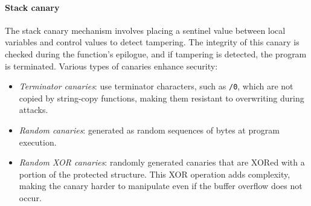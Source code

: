 \paragraph*{Stack canary}
The stack canary mechanism involves placing a sentinel value between local variables and control values to detect tampering.
The integrity of this canary is checked during the function's epilogue, and if tampering is detected, the program is terminated. 
Various types of canaries enhance security:
\begin{itemize}
    \item \textit{Terminator canaries}: use terminator characters, such as \texttt{/0}, which are not copied by string-copy functions, making them resistant to overwriting during attacks.
    \item \textit{Random canaries}: generated as random sequences of bytes at program execution.
    \item \textit{Random XOR canaries}: randomly generated canaries that are XORed with a portion of the protected structure. 
        This XOR operation adds complexity, making the canary harder to manipulate even if the buffer overflow does not occur.
\end{itemize}